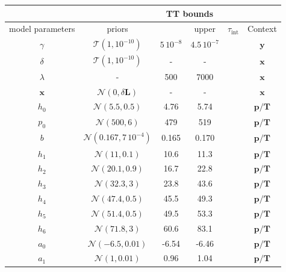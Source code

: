 \begin{table}
	\centering
	\begin{tabular}{ |c||c|c|c|c|c|   }
		\hline
		& &\multicolumn{2}{|c|}{TT bounds}& &\\
		\hline
		model parameters& priors&\makecell{lower}& \makecell{upper\\
		}&$\tau_{\text{int}}$&Context\\
		\hhline{|=||=|=|=|=|=|}
		$\gamma$ & $\mathcal{T}(1,10^{-10})$ &$5 \, 10^{-8}$ &$4.5 \, 10^{-7}$& &$\bm{y}$\\ \hline
		$\delta$ &$\mathcal{T}(1,10^{-10})$ & -&-& & $\bm{x}$\\ \hline
		$\lambda$ &- & 500&7000& &$\bm{x}$\\ \hline
		$\bm{x}$ &$\mathcal{N}(0,\delta \bm{L})$ & -&-&& $\bm{x}$\\ \hhline{|=||=|=|=|=|=|}
		$h_0$ &  $\mathcal{N}(5.5,0.5)$& 4.76&5.74&&$\bm{p/T}$\\ \hline
		$p_0$ &  $\mathcal{N}(500,6)$&479 &519&&$\bm{p/T}$\\ \hline
		$b$ &  $\mathcal{N}(0.167,7\,10^{-4})$& 0.165& 0.170 &&$\bm{p/T}$\\ \hline
		$h_{1}$ &  $\mathcal{N}(11,0.1)$&10.6 &11.3&&$\bm{p/T}$\\ \hline
		$h_{2}$ &  $\mathcal{N}(20.1,0.9)$&16.7 &22.8&&$\bm{p/T}$\\ \hline
		$h_{3}$ &  $\mathcal{N}(32.3,3)$&23.8&43.6&&$\bm{p/T}$\\ \hline
		$h_{4}$ &  $\mathcal{N}(47.4,0.5)$&45.5 &49.3&&$\bm{p/T}$\\ \hline
		$h_{5}$ &  $\mathcal{N}(51.4,0.5)$&49.5 &53.3&&$\bm{p/T}$\\ \hline
		$h_{6}$ &  $\mathcal{N}(71.8,3)$&60.6 &83.1&&$\bm{p/T}$\\ \hline
		$a_{0}$ &  $\mathcal{N}(-6.5,0.01)$&-6.54 &-6.46&&$\bm{p/T}$\\ \hline
		$a_{1}$ &  $\mathcal{N}(1,0.01)$&0.96 &1.04&&$\bm{p/T}$\\ \hline

\end{tabular}
\end{table}

